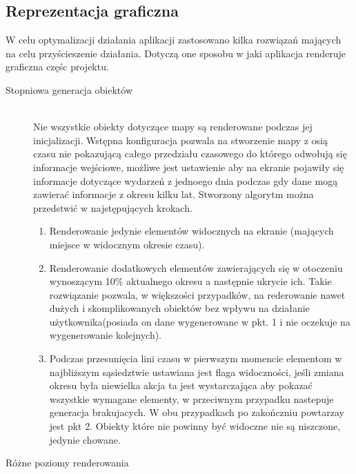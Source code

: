 \subsection{Reprezentacja graficzna}
\label{subsec:showing}

W celu optymalizacji działania aplikacji zastosowano kilka rozwiązań mających na celu przyścieszenie działania. Dotyczą one sposobu w jaki aplikacja renderuje graficzna częśc projektu.


\begin{description}
\item[Stopniowa generacja obiektów]\hfill \\
Nie wszystkie obiekty dotyczące mapy są renderowane podczas jej inicjalizacji. Wstępna konfiguracja pozwala na stworzenie mapy z osią czasu nie pokazującą całego przedziału czasowego do którego odwołują się informacje wejściowe, możliwe jest ustawienie aby na ekranie pojawiły się informacje dotyczące wydarzeń z jednoego dnia podczas gdy dane mogą zawierać informacje z okresu kilku lat. Stworzony algorytm można przedstwić w najstępujących krokach.

\begin{enumerate}
\item
Renderowanie jedynie elementów widocznych na ekranie (mających miejsce w widocznym okresie czasu).

\item
Renderowanie dodatkowych elementów zawierających się w otoczeniu wynoszącym 10\% aktualnego okresu a następnie ukrycie ich. Takie rozwiązanie pozwala, w większości przypadków, na rederowanie nawet dużych i skomplikowanych obiektów bez wpływu na działanie użytkownika(posiada on dane wygenerowane w pkt. 1 i nie oczekuje na wygenerowanie kolejnych).

\item
Podczas przesunięcia lini czasu w pierwszym momencie elementom w najbliższym sąsiedztwie ustawiana jest flaga widoczności, jeśli zmiana okresu była niewielka akcja ta jest wystarczająca aby pokazać wszystkie wymagane elementy, w przeciwnym przypadku nastepuje generacja brakujacych. W obu przypadkach po zakończniu powtarzay jest pkt 2. Obiekty które nie powinny być widoczne nie są niszczone, jedynie chowane.

\end{enumerate}

\item[Różne poziomy renderowania]\hfill \\


\end{description}
